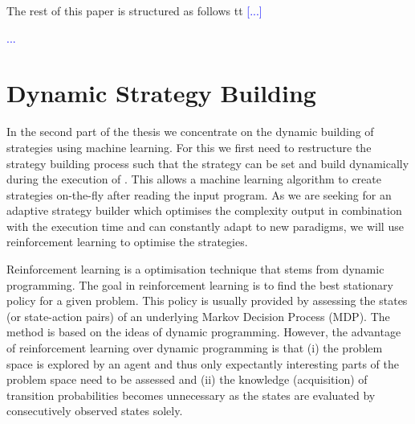 \documentclass[envcountsame]{llncs}
\newcommand\MS[2][r]{\ifx t#1 \textcolor{blue}{[#2]}%
\else \begin{center}\textcolor{blue}{#2} \end{center} \fi}%
\begin{document}

The rest of this paper is structured as follows \MS[t]{...}


\section{Dynamic Strategy Building}


In the second part of the thesis we concentrate on the dynamic building of strategies using machine
learning. For this we first need to restructure the strategy building process such that the strategy
can be set and build dynamically during the execution of \tct{}. This allows a machine learning
algorithm to create strategies on-the-fly after reading the input program. As we are seeking for an
adaptive strategy builder which optimises the complexity output in combination with the execution
time and can constantly adapt to new paradigms, we will use reinforcement learning to optimise the
strategies.

Reinforcement learning is a optimisation technique that stems from dynamic programming. The goal in
reinforcement learning is to find the best stationary policy for a given problem. This policy is
usually provided by assessing the states (or state-action pairs) of an underlying Markov Decision
Process (MDP). The method is based on the ideas of dynamic programming. However, the advantage of
reinforcement learning over dynamic programming is that (i) the problem space is explored by an
agent and thus only expectantly interesting parts of the problem space need to be assessed and (ii)
the knowledge (acquisition) of transition probabilities becomes unnecessary as the states are
evaluated by consecutively observed states solely.
\end{document}
